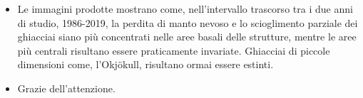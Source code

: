\documentclass{beamer}
\begin{document}
\begin{frame}
\begin{itemize}
    \item Le immagini prodotte mostrano come,  nell'intervallo trascorso tra i due anni di studio, 1986-2019, la perdita di manto nevoso e lo scioglimento parziale dei ghiacciai siano più concentrati nelle aree basali delle strutture, mentre le aree più centrali risultano essere praticamente invariate.
    Ghiacciai di piccole dimensioni come, l'Okjökull, risultano ormai essere estinti.
\end{itemize}
\end{frame}

\begin{frame}
\begin{itemize}
    \item Grazie dell'attenzione.
\end{itemize}
\end{frame}
\end{document}

